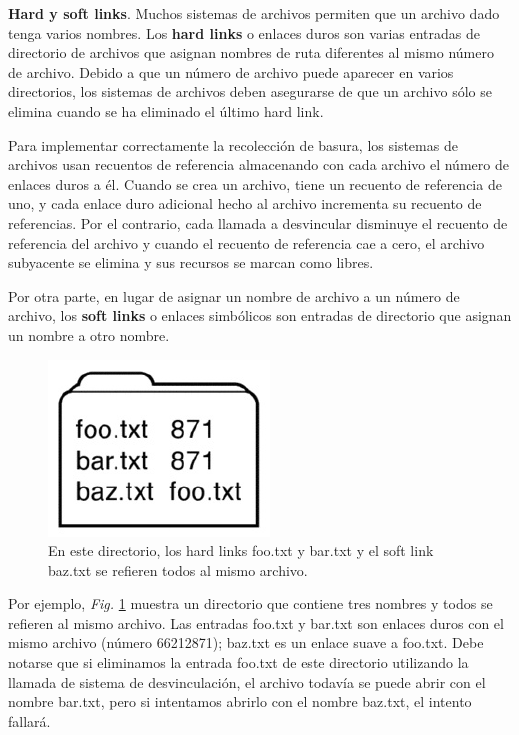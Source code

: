 \documentclass[10pt]{book}
\begin{document}
\textbf{Hard y soft links}. Muchos sistemas de archivos permiten que un archivo dado tenga varios nombres. Los \textbf{hard links} o enlaces duros son varias entradas de directorio de archivos que asignan nombres de ruta diferentes al mismo número de archivo. Debido a que un número de archivo puede aparecer en varios directorios, los sistemas de archivos deben asegurarse de que un archivo sólo se elimina cuando se ha eliminado el último hard link.

Para implementar correctamente la recolección de basura, los sistemas de archivos usan recuentos de referencia almacenando con cada archivo el número de enlaces duros a él. Cuando se crea un archivo, tiene un recuento de referencia de uno, y cada enlace duro adicional hecho al archivo incrementa su recuento de referencias. Por el contrario, cada llamada a desvincular disminuye el recuento de referencia del archivo y cuando el recuento de referencia cae a cero, el archivo subyacente se elimina y sus recursos se marcan como libres.

Por otra parte, en lugar de asignar un nombre de archivo a un número de archivo, los \textbf{soft links} o enlaces simbólicos son entradas de directorio que asignan un nombre a otro nombre.

\begin{figure}[tbhp]
\centerline{\includegraphics[scale=0.50]{img/fig1305}}
\caption{En este directorio, los hard links {\mf foo.txt} y {\mf bar.txt} y el soft link {\mf baz.txt} se refieren todos al mismo archivo.}
\label{fig1305}
\end{figure}

Por ejemplo, \textit{Fig.} \ref{fig1305} muestra un directorio que contiene tres nombres y todos se refieren al mismo archivo. Las entradas {\mf foo.txt} y {\mf bar.txt} son enlaces duros con el mismo archivo (número 66212871); {\mf baz.txt} es un enlace suave a {\mf foo.txt}. Debe notarse que si eliminamos la entrada {\mf foo.txt} de este directorio utilizando la llamada de sistema de desvinculación, el archivo todavía se puede abrir con el nombre {\mf bar.txt}, pero si intentamos abrirlo con el nombre {\mf baz.txt}, el intento fallará.
\end{document}
